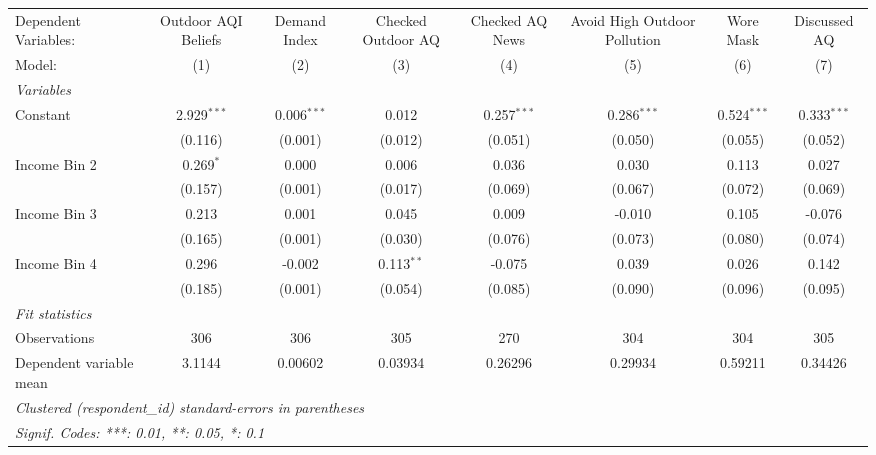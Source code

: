 
\begingroup
\centering
\begin{tabular}{lccccccc}
   \tabularnewline \midrule \midrule
   Dependent Variables:    & Outdoor AQI Beliefs & Demand Index  & Checked Outdoor AQ & Checked AQ News & Avoid High Outdoor Pollution & Wore Mask     & Discussed AQ\\  
   Model:                  & (1)                 & (2)           & (3)                & (4)             & (5)                          & (6)           & (7)\\  
   \midrule
   \emph{Variables}\\
   Constant                & 2.929$^{***}$       & 0.006$^{***}$ & 0.012              & 0.257$^{***}$   & 0.286$^{***}$                & 0.524$^{***}$ & 0.333$^{***}$\\   
                           & (0.116)             & (0.001)       & (0.012)            & (0.051)         & (0.050)                      & (0.055)       & (0.052)\\   
   Income Bin 2            & 0.269$^{*}$         & 0.000         & 0.006              & 0.036           & 0.030                        & 0.113         & 0.027\\   
                           & (0.157)             & (0.001)       & (0.017)            & (0.069)         & (0.067)                      & (0.072)       & (0.069)\\   
   Income Bin 3            & 0.213               & 0.001         & 0.045              & 0.009           & -0.010                       & 0.105         & -0.076\\   
                           & (0.165)             & (0.001)       & (0.030)            & (0.076)         & (0.073)                      & (0.080)       & (0.074)\\   
   Income Bin 4            & 0.296               & -0.002        & 0.113$^{**}$       & -0.075          & 0.039                        & 0.026         & 0.142\\   
                           & (0.185)             & (0.001)       & (0.054)            & (0.085)         & (0.090)                      & (0.096)       & (0.095)\\   
   \midrule
   \emph{Fit statistics}\\
   Observations            & 306                 & 306           & 305                & 270             & 304                          & 304           & 305\\  
   Dependent variable mean & 3.1144              & 0.00602       & 0.03934            & 0.26296         & 0.29934                      & 0.59211       & 0.34426\\  
   \midrule \midrule
   \multicolumn{8}{l}{\emph{Clustered (respondent\_id) standard-errors in parentheses}}\\
   \multicolumn{8}{l}{\emph{Signif. Codes: ***: 0.01, **: 0.05, *: 0.1}}\\
\end{tabular}
\par\endgroup


